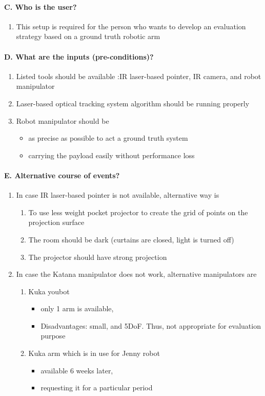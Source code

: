 \paragraph{C.	Who is the user?}
\begin{enumerate}
	\item This setup is required for the person who wants to develop an evaluation strategy based on a ground truth robotic arm 
\end{enumerate}
\paragraph{D.	What are the inputs (pre-conditions)?}
\begin{enumerate}
	\item Listed tools should be available :IR laser-based pointer, IR camera, and robot manipulator
	\item	Laser-based optical tracking system algorithm should be running properly
	\item	Robot manipulator should be 
		\begin{itemize}
			\item as precise as possible to act a ground truth system 
  		\item carrying the payload easily without performance loss
		\end{itemize}
\end{enumerate}
\paragraph{E.	Alternative course of events?}
\begin{enumerate}
	\item In case IR laser-based pointer is not available, alternative way is
 			\begin{enumerate}
			\item To use less weight pocket projector to create the  grid of points on the projection surface
  		\item The room should be dark (curtains are closed, light is turned off)
  		\item The projector should have strong projection
			\end{enumerate}
	\item In case the Katana manipulator does not work, alternative manipulators  are
	\begin{enumerate}
		\item Kuka youbot 		
			\begin{itemize}
			\item only 1 arm is available, 
			\item	Disadvantages: small, and 5DoF. Thus, not appropriate for evaluation purpose
			\end{itemize}
		\item Kuka arm which is in use for Jenny robot
	\begin{itemize}
		\item available 6 weeks later, 
		\item	requesting it for a particular period
	\end{itemize}
	\end{enumerate}
\end{enumerate}

